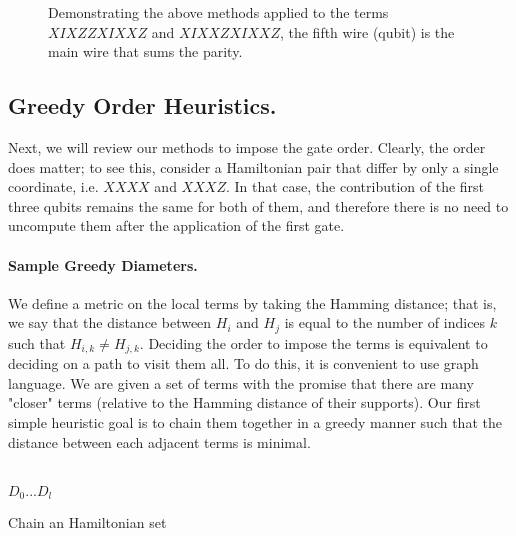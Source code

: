\documentclass{article}
\begin{document}
\begin{figure*}[h]
    
    \caption{ Demonstrating the above methods applied to the terms \( XIXZZXIXXZ \) and \( XIXXZXIXXZ \), the fifth wire (qubit) is the main wire that sums the parity.}
    \label{fig:average-data-vs-model}
\end{figure*}
\begin{multicols}{2}

\section{Greedy Order Heuristics.} Next, we will review our methods to impose the gate order. Clearly, the order does matter; to see this, consider a Hamiltonian pair that differ by only a single coordinate, i.e. \(XXXX\) and \(XXXZ\). In that case, the contribution of the first three qubits remains the same for both of them, and therefore there is no need to uncompute them after the application of the first gate.

\paragraph{Sample Greedy Diameters.} We define a metric on the local terms by taking the Hamming distance; that is, we say that the distance between $H_{i}$ and $H_{j}$ is equal to the number of indices $k$ such that $H_{i,k} \neq H_{j,k}$. Deciding the order to impose the terms is equivalent to deciding on a path to visit them all. To do this, it is convenient to use graph language. We are given a set of terms with the promise that there are many "closer" terms (relative to the Hamming distance of their supports). Our first simple heuristic goal is to chain them together in a greedy manner such that the distance between each adjacent terms is minimal.
\end{multicols}
\begin{algorithm*}[h]
\ \\ 
\Return \(D_{0} ... D_{l}\) 
 \caption{Chain an Hamiltonian set }
\end{algorithm*}
\end{document}
